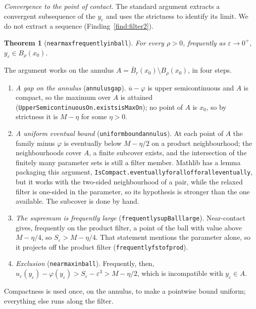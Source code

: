 \documentclass[11pt,reqno]{amsart}
\newcommand{\LEANREF}[1]{\texttt{\small\def\_{\textunderscore\allowbreak}#1}}
\newcommand{\eps}{\varepsilon}
\theoremstyle{plain}
\newtheorem{theorem}{Theorem}[section]
\theoremstyle{definition}
\begin{document}
\emph{Convergence to the point of contact.} The standard argument extracts a
convergent subsequence of the $y_\eps$ and uses the strictness to identify its
limit. We do not extract a sequence (Finding~\ref{find:filter2}).

\begin{theorem}[\LEANREF{nearmax\_frequently\_in\_ball}]\label{thm:nearfreq}
For every $\rho > 0$, frequently as $\eps \to 0^+$, $y_\eps \in B_\rho(x_0)$.
\end{theorem}

The argument works on the annulus
$A = \overline{B}_r(x_0) \setminus B_\rho(x_0)$, in four steps.
\begin{enumerate}
  \item \emph{A gap on the annulus} (\LEANREF{annulus\_gap}).
        $\overline{u} - \varphi$ is upper semicontinuous and $A$ is compact, so
        the maximum over $A$ is attained
        (\LEANREF{UpperSemicontinuousOn.exists\_isMaxOn}); no point of $A$ is
        $x_0$, so by strictness it is $M - \eta$ for some $\eta > 0$.
  \item \emph{A uniform eventual bound} (\LEANREF{uniform\_bound\_annulus}).
        At each point of $A$ the family minus $\varphi$ is eventually below
        $M - \eta/2$ on a product neighbourhood; the neighbourhoods cover $A$,
        a finite subcover exists, and the intersection of the finitely many
        parameter sets is still a filter member. Mathlib has a lemma
        packaging this argument, \LEANREF{IsCompact.eventually\_forall\_of\_forall\_eventually},
        but it works with the two-sided neighbourhood of a pair, while the
        relaxed filter is one-sided in the parameter, so its hypothesis is
        stronger than the one available. The subcover is done by hand.
  \item \emph{The supremum is frequently large}
        (\LEANREF{frequently\_supBall\_large}). Near-contact gives, frequently
        on the product filter, a point of the ball with value above
        $M - \eta/4$, so $S_\eps > M - \eta/4$. That statement mentions the
        parameter alone, so it projects off the product filter
        (\LEANREF{frequently\_fst\_of\_prod}).
  \item \emph{Exclusion} (\LEANREF{nearmax\_in\_ball}). Frequently, then,
        $u_\eps(y_\eps) - \varphi(y_\eps) > S_\eps - \eps^3 > M - \eta/2$,
        which is incompatible with $y_\eps \in A$.
\end{enumerate}
Compactness is used once, on the annulus, to make a pointwise bound uniform;
everything else runs along the filter.
\end{document}
